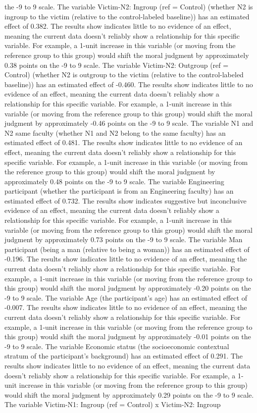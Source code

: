 \documentclass[11pt]{article}
\begin{document}
the -9 to 9 scale. The variable Victim-N2: Ingroup (ref = Control) (whether N2 is ingroup to the victim (relative to the control-labeled baseline)) has an estimated effect of 0.382. The results show indicates little to no evidence of an effect, meaning the current data doesn't reliably show a relationship for this specific variable. For example, a 1-unit increase in this variable (or moving from the reference group to this group) would shift the moral judgment by approximately 0.38 points on the -9 to 9 scale. The variable Victim-N2: Outgroup (ref = Control) (whether N2 is outgroup to the victim (relative to the control-labeled baseline)) has an estimated effect of -0.460. The results show indicates little to no evidence of an effect, meaning the current data doesn't reliably show a relationship for this specific variable. For example, a 1-unit increase in this variable (or moving from the reference group to this group) would shift the moral judgment by approximately -0.46 points on the -9 to 9 scale. The variable N1 and N2 same faculty (whether N1 and N2 belong to the same faculty) has an estimated effect of 0.481. The results show indicates little to no evidence of an effect, meaning the current data doesn't reliably show a relationship for this specific variable. For example, a 1-unit increase in this variable (or moving from the reference group to this group) would shift the moral judgment by approximately 0.48 points on the -9 to 9 scale. The variable Engineering participant (whether the participant is from an Engineering faculty) has an estimated effect of 0.732. The results show indicates suggestive but inconclusive evidence of an effect, meaning the current data doesn't reliably show a relationship for this specific variable. For example, a 1-unit increase in this variable (or moving from the reference group to this group) would shift the moral judgment by approximately 0.73 points on the -9 to 9 scale. The variable Man participant (being a man (relative to being a woman)) has an estimated effect of -0.196. The results show indicates little to no evidence of an effect, meaning the current data doesn't reliably show a relationship for this specific variable. For example, a 1-unit increase in this variable (or moving from the reference group to this group) would shift the moral judgment by approximately -0.20 points on the -9 to 9 scale. The variable Age (the participant's age) has an estimated effect of -0.007. The results show indicates little to no evidence of an effect, meaning the current data doesn't reliably show a relationship for this specific variable. For example, a 1-unit increase in this variable (or moving from the reference group to this group) would shift the moral judgment by approximately -0.01 points on the -9 to 9 scale. The variable Economic status (the socioeconomic contextual stratum of the participant's background) has an estimated effect of 0.291. The results show indicates little to no evidence of an effect, meaning the current data doesn't reliably show a relationship for this specific variable. For example, a 1-unit increase in this variable (or moving from the reference group to this group) would shift the moral judgment by approximately 0.29 points on the -9 to 9 scale. The variable Victim-N1: Ingroup (ref = Control) x Victim-N2: Ingroup 
\end{document}

